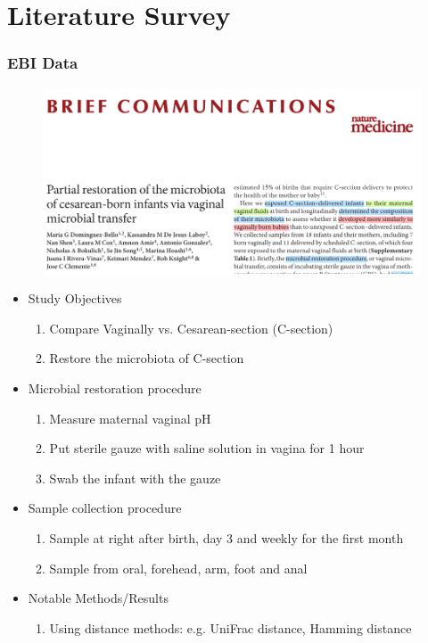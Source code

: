 \documentclass{beamer}
\begin{document}
    \section{Literature Survey }
    \begin{frame}[allowframebreaks]
        \frametitle{EBI Data \protect \cite{validate1}}

        \begin{figure}
            \includegraphics[width=0.8 \linewidth]{figures/Literature/EBI/title.png}
        \end{figure}
        \newpage

        \begin{itemize}
            \item Study Objectives
            \begin{enumerate}
                \item Compare Vaginally vs. Cesarean-section (C-section)
                \item Restore the microbiota of C-section
            \end{enumerate}

            \item Microbial restoration procedure
            \begin{enumerate}
                \item Measure maternal vaginal pH
                \item Put sterile gauze with saline solution in vagina for 1 hour
                \item Swab the infant with the gauze
            \end{enumerate}

            \item Sample collection procedure
            \begin{enumerate}
                \item Sample at right after birth, day 3 and weekly for the first month
                \item Sample from oral, forehead, arm, foot and anal
            \end{enumerate}

            \item Notable Methods/Results
            \begin{enumerate}
                \item Using distance methods: e.g. UniFrac distance, Hamming distance
            \end{enumerate}
        \end{itemize}
    \end{frame}
\end{document}
